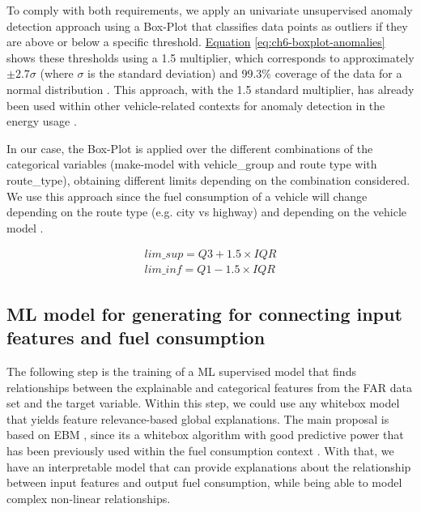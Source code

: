 To comply with both requirements, we apply an univariate unsupervised anomaly detection approach using a Box-Plot that classifies data points as outliers if they are above or below a specific threshold. \hyperref[eq:ch6-boxplot-anomalies]{Equation} \ref{eq:ch6-boxplot-anomalies} shows these thresholds using a 1.5 multiplier, which corresponds to approximately $\pm2.7\sigma$ (where $\sigma$ is the standard deviation) and 99.3\% coverage of the data for a normal distribution \parencite{mcgill1978variations, krzywinski2014visualizing}. This approach, with the 1.5 standard multiplier, has already been used within other vehicle-related contexts for anomaly detection in the energy usage \parencite{yin2019voltage, schuster2015lithium}.

In our case, the Box-Plot is applied over the different combinations of the categorical variables (make-model with vehicle\_group and route type with route\_type), obtaining different limits depending on the combination considered. We use this approach since the fuel consumption of a vehicle will change depending on the route type (e.g. city vs highway) and depending on the vehicle model \parencite{rakha2011virginia, zacharof2016review}.

\begin{equation}\label{eq:ch6-boxplot-anomalies}
\begin{split}
lim\_sup = Q3 + 1.5 \times IQR \\
lim\_inf = Q1 - 1.5 \times IQR
\end{split}
\end{equation}

\subsection{ML model for generating for connecting input features and fuel consumption}\label{subsec:ch6-ml-model}
The following step is the training of a ML supervised model that finds relationships between the explainable and categorical features from the FAR data set and the target variable. Within this step, we could use any whitebox model that yields feature relevance-based global explanations. The main proposal is based on EBM \parencite{nori2019interpretml}, since its a whitebox algorithm with good predictive power that has been previously used within the fuel consumption context \parencite{barbado2021understanding}. With that, we have an interpretable model that can provide explanations about the relationship between input features and output fuel consumption, while being able to model complex non-linear relationships.

